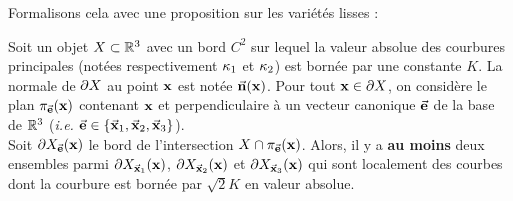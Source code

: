 \noindent Formalisons cela avec une proposition sur les variétés lisses :
%
\begin{proposition}
\label{prop:slices-3d}
  Soit un objet $X \subset \mathbb{R}^3$ avec un bord $C^2$ sur lequel la valeur
  absolue des courbures principales (notées respectivement $\kappa_{1}$ et
  $\kappa_{2}$) est bornée par une constante $K$. La normale de $\partial X$ au
  point $\mathbf{x}$ est notée $\vec{\mathbf{n}}(\mathbf{x})$. Pour tout $\mathbf{x} \in \partial X$, on
  considère le plan $\pi_{\vec{\mathbf{e}}}(\mathbf{x})$ contenant $\mathbf{x}$ et perpendiculaire à
  un vecteur canonique $\vec{\mathbf{e}}$ de la base de $\mathbb{R}^3$ (\emph{i.e.}
  $\vec{\mathbf{e}}\in\{ \vec{\mathbf{x}}_1, \vec{\mathbf{x}}_2, \vec{\mathbf{x}}_3 \}$).
  \\
  Soit $\partial X_{\vec{\mathbf{e}}}(\mathbf{x})$ le bord de l'intersection $X
  \cap \pi_{\vec{\mathbf{e}}}(\mathbf{x})$. Alors, il y a \textbf{au moins} deux ensembles parmi
  $\partial X_{\vec{\mathbf{x}}_1}(\mathbf{x})$, $\partial X_{\vec{\mathbf{x}}_2}(\mathbf{x})$ et
  $\partial X_{\vec{\mathbf{x}}_3}(\mathbf{x})$ qui sont localement des courbes dont la
  courbure est bornée par $\sqrt{2}K$ en valeur absolue.
\end{proposition}
